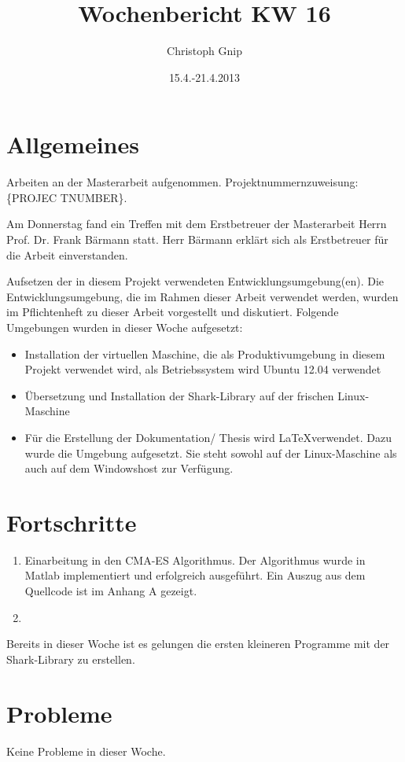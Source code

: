 ﻿\documentclass[a4paper,10pt,fleqn]{scrartcl}
\title{Wochenbericht KW 16}
\author{Christoph Gnip}
\date{ 15.4.-21.4.2013 }
\begin{document}
\maketitle



\section[Allgemeines]{Allgemeines}

Arbeiten an der Masterarbeit aufgenommen. Projektnummernzuweisung:
\{PROJEC TNUMBER\}.

Am Donnerstag fand ein Treffen mit dem Erstbetreuer der Masterarbeit Herrn Prof.
Dr. Frank Bärmann statt. Herr Bärmann erklärt sich als Erstbetreuer für die
Arbeit einverstanden.

Aufsetzen der in diesem Projekt verwendeten Entwicklungsumgebung(en). Die
Entwicklungsumgebung, die im Rahmen dieser Arbeit
verwendet werden, wurden im
Pflichtenheft zu dieser Arbeit vorgestellt und diskutiert.
\newline
Folgende Umgebungen wurden in dieser Woche aufgesetzt:
\begin{itemize}
 \item Installation der virtuellen Maschine, die als Produktivumgebung in
diesem Projekt verwendet wird, als Betriebssystem wird Ubuntu 12.04 verwendet
 \item Übersetzung und Installation der Shark-Library auf der frischen
Linux-Maschine
 \item Für die Erstellung der Dokumentation/ Thesis wird \LaTeX verwendet.
Dazu wurde die Umgebung aufgesetzt. Sie steht sowohl auf der Linux-Maschine als
auch auf dem Windowshost zur Verfügung.
\end{itemize}


\section[Fortschritte]{Fortschritte}
\begin{enumerate}
 \item Einarbeitung in den CMA-ES Algorithmus. Der Algorithmus wurde in Matlab
implementiert und erfolgreich ausgeführt. Ein Auszug aus dem Quellcode ist im
{Anhang A} gezeigt.
 \item

\end{enumerate}

Bereits in dieser Woche ist es gelungen die ersten kleineren Programme mit der
Shark-Library zu erstellen.

\section[Probleme]{Probleme}

Keine Probleme in dieser Woche.
\end{document}
